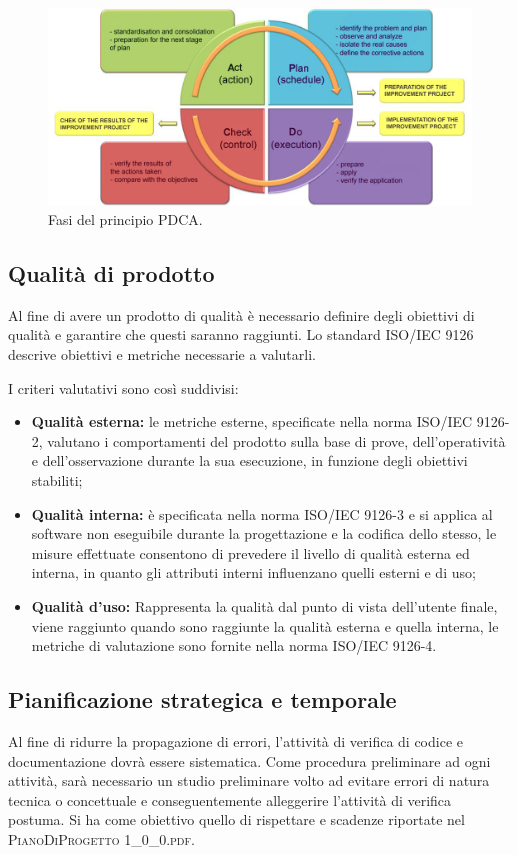 	\begin{figure}[H]
		\centering
		\includegraphics[scale=0.6]{includes/img/pdca.png}
		\caption{Fasi del principio PDCA.}
	\end{figure}
	
	\subsection{Qualità di prodotto}
	Al fine di avere un prodotto di qualità è necessario definire degli obiettivi di qualità e garantire che questi saranno raggiunti. 
	Lo standard ISO/IEC 9126 descrive obiettivi e metriche necessarie a valutarli.
	
	I criteri valutativi sono così suddivisi:
	
	\begin{itemize}
		\item \textbf{Qualità esterna: }le metriche esterne, specificate nella norma ISO/IEC 9126-2, valutano i comportamenti del prodotto sulla base di prove, dell'operatività e dell'osservazione durante la sua esecuzione, in funzione degli obiettivi stabiliti;
		\item \textbf{Qualità interna: }è specificata nella norma ISO/IEC 9126-3 e si applica al software non eseguibile
		durante la progettazione e la codifica dello stesso, le misure effettuate consentono di prevedere il livello di qualità esterna ed interna, in quanto gli attributi interni influenzano quelli esterni e di uso;
		\item \textbf{Qualità d'uso: }Rappresenta la qualità dal punto di vista dell'utente finale, viene raggiunto quando sono raggiunte la qualità esterna e quella interna, le metriche di valutazione sono fornite nella norma ISO/IEC 9126-4.
	\end{itemize}
	
	
	\subsection{Pianificazione strategica e temporale}
	Al fine di ridurre la propagazione di errori, l’attività di verifica di codice e documentazione dovrà essere sistematica. 
	Come procedura preliminare ad ogni attività, sarà necessario un studio preliminare volto ad evitare errori di natura tecnica o concettuale e conseguentemente alleggerire l’attività di verifica postuma.
	Si ha come obiettivo quello di rispettare e scadenze riportate nel \textsc{PianoDiProgetto 1\_0\_0.pdf}.
	

